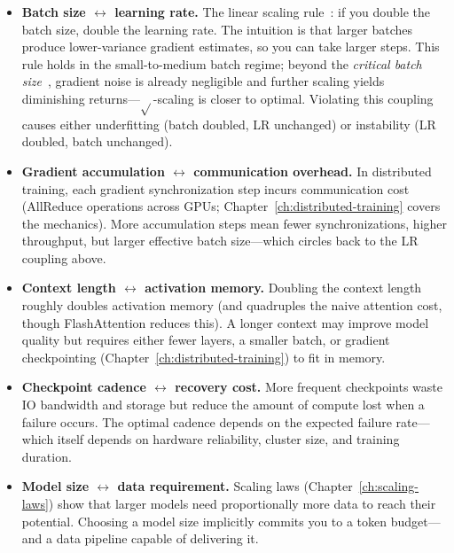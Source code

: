 \begin{itemize}[nosep]
  \item \textbf{Batch size $\leftrightarrow$ learning rate.} The linear scaling rule~\cite{goyal2017imagenet}: if you double the batch size, double the learning rate. The intuition is that larger batches produce lower-variance gradient estimates, so you can take larger steps. This rule holds in the small-to-medium batch regime; beyond the \emph{critical batch size}~\cite{mccandlish2018empirical}, gradient noise is already negligible and further scaling yields diminishing returns---$\sqrt{}$-scaling is closer to optimal. Violating this coupling causes either underfitting (batch doubled, LR unchanged) or instability (LR doubled, batch unchanged).
  \item \textbf{Gradient accumulation $\leftrightarrow$ communication overhead.} In distributed training, each gradient synchronization step incurs communication cost (AllReduce operations across GPUs; Chapter~\ref{ch:distributed-training} covers the mechanics). More accumulation steps mean fewer synchronizations, higher throughput, but larger effective batch size---which circles back to the LR coupling above.
  \item \textbf{Context length $\leftrightarrow$ activation memory.} Doubling the context length roughly doubles activation memory (and quadruples the naive attention cost, though FlashAttention reduces this). A longer context may improve model quality but requires either fewer layers, a smaller batch, or gradient checkpointing (Chapter~\ref{ch:distributed-training}) to fit in memory.
  \item \textbf{Checkpoint cadence $\leftrightarrow$ recovery cost.} More frequent checkpoints waste IO bandwidth and storage but reduce the amount of compute lost when a failure occurs. The optimal cadence depends on the expected failure rate---which itself depends on hardware reliability, cluster size, and training duration.
  \item \textbf{Model size $\leftrightarrow$ data requirement.} Scaling laws (Chapter~\ref{ch:scaling-laws}) show that larger models need proportionally more data to reach their potential. Choosing a model size implicitly commits you to a token budget---and a data pipeline capable of delivering it.
\end{itemize}

\medskip
\noindent{}
\medskip

